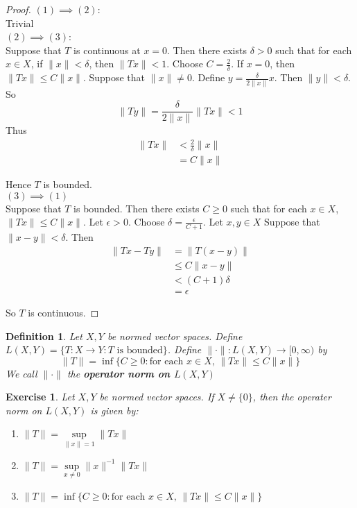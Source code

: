 \documentclass[12pt]{amsart}
\newtheorem{defn}[thm]{Definition}
\newtheorem{ex}[thm]{Exercise}
\newcommand{\del}{\delta}
\newcommand{\ep}{\epsilon}
\newcommand{\Rg}{[0,\infty)}
\begin{document}
	\begin{proof}
		$(1) \implies (2)$:\\
		Trivial\vspace{1cm}\\
		$(2) \implies (3)$:\\
		Suppose that $T$ is continuous at $x=0$. Then there exists $\del>0$ such that for each $x \in X$, if $\|x \|< \del$, then $\|Tx \|< 1$. Choose $C = \frac{2}{\del}$. If $x=0$, then $\|Tx \|\leq C \|x \|$. Suppose that $\|x \|\neq 0$. Define $y = \frac{\del}{2 \|x \|}x$. Then $\|y \|< \del$. So $$ \|Ty \|
		= \frac{\del}{2 \|x \|} \|Tx \|< 1$$
		Thus 
		\begin{align*}
			\|Tx \|
			&< \frac{2}{\del} \|x \| \\
			&=C \|x \|
		\end{align*}
		
		Hence $T$ is bounded.\vspace{1cm}\\
		$(3) \implies (1)$\\
		Suppose that $T$ is bounded. Then there exists $C \geq 0$ such that for each $x \in X$, $\|Tx \|\leq C\|x \|$. Let $\ep >0$. Choose $\del = \frac{\ep}{C+1}$. Let $x,y \in X$ Suppose that $\|x-y \|< \del$. Then 
		\begin{align*}
			\|Tx-Ty \|
			& = \|T(x-y) \| \\
			& \leq C \|x-y \|\\
			&< (C+1) \del\\ 
			&= \ep
		\end{align*}
		
		So $T$ is continuous.
	\end{proof}
	
	\begin{defn}
		Let $X,Y$ be normed vector spaces. Define $L(X,Y) = \{T:X \rightarrow Y: T \text{ is bounded}\}$. Define $\|\cdot\|: L(X,Y)\rightarrow \Rg$ by $$\|T\| = \inf \{C \geq 0: \text{for each }x \in X\text{, } \|Tx \|\leq C\|x\|\}$$ We call $\|\cdot \|$ the \textbf{operator norm on $L(X,Y)$}
	\end{defn}
	
	\begin{ex}
		Let $X,Y$ be normed vector spaces. If $X\neq \{0\}$, then the operater norm on $L(X,Y)$ is given by: 
		\begin{enumerate}
			\item $\|T\| = \sup\limits_{\|x\|=1}\|Tx\|$
			\item $\|T\| = \sup\limits_{x \neq 0}\|x\|^{-1} \|Tx\|$
			\item $\|T\| = \inf \{C \geq 0: \text{for each }x \in X\text{, } \|Tx \|\leq C\|x\|\}$
		\end{enumerate}
	\end{ex}
	
\end{document}
